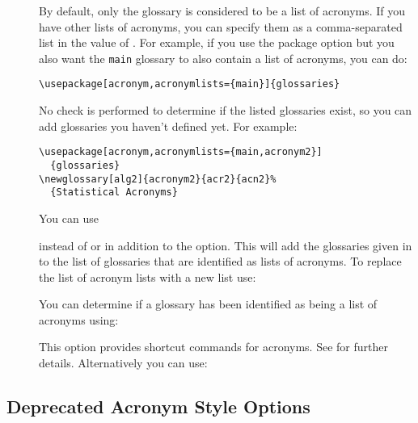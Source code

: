 \documentclass[report,inlinetitle]{nlctdoc}
\begin{document}
\begin{description}
\item[] By default, only the 
glossary is considered to be a list of acronyms. If you have other
lists of acronyms, you can specify them as a comma-separated list
in the value of . For example, if you use the
 package option but you also want the \texttt{main} 
glossary to also contain a list of acronyms, you can do:
\begin{verbatim}
\usepackage[acronym,acronymlists={main}]{glossaries}
\end{verbatim}
No check is performed to determine if the listed glossaries exist,
so you can add glossaries you haven't defined yet. For example:
\begin{verbatim}
\usepackage[acronym,acronymlists={main,acronym2}]
  {glossaries}
\newglossary[alg2]{acronym2}{acr2}{acn2}%
  {Statistical Acronyms}
\end{verbatim}
You can use
\begin{definition}[\DescribeMacro\DeclareAcronymList]
\end{definition}
instead of or in addition to the  option.
This will add the glossaries given in  to the list of glossaries
that are identified as lists of acronyms. To replace the list of acronym lists
with a new list use:
\begin{definition}[\DescribeMacro\SetAcronymLists]
\end{definition}

You can determine if a glossary has been identified as being a list
of acronyms using:
\begin{definition}[\DescribeMacro\glsIfListOfAcronyms]
\end{definition}

\item[] This option provides shortcut commands
for acronyms.  See  for further details.
Alternatively you can use:
\begin{definition}[\DescribeMacro\DefineAcronymShortcuts]
\end{definition}
\end{description}

\subsection{Deprecated Acronym Style Options}
\label{sec:pkgopts-old-acronym}
\end{document}
